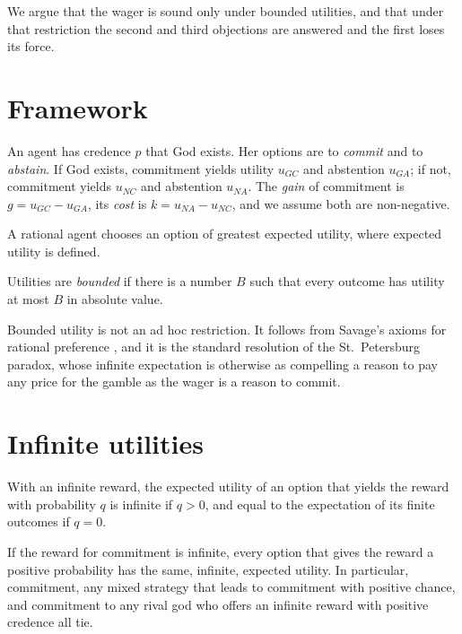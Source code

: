 \documentclass{situationist-preprint}
\begin{document}
We argue that the wager is sound only under bounded utilities, and that under that restriction the second and third objections are answered and the first loses its force.

\section{Framework}

\begin{definition}\label{d:wager}
An agent has credence $p$ that God exists. Her options are to \emph{commit} and to \emph{abstain}. If God exists, commitment yields utility $u_{GC}$ and abstention $u_{GA}$; if not, commitment yields $u_{NC}$ and abstention $u_{NA}$. The \emph{gain} of commitment is $g = u_{GC} - u_{GA}$, its \emph{cost} is $k = u_{NA} - u_{NC}$, and we assume both are non-negative.
\end{definition}

\begin{assumption}\label{a:eu}
A rational agent chooses an option of greatest expected utility, where expected utility is defined.
\end{assumption}

\begin{definition}\label{d:bounded}
Utilities are \emph{bounded} if there is a number $B$ such that every outcome has utility at most $B$ in absolute value.
\end{definition}

Bounded utility is not an ad hoc restriction. It follows from Savage's axioms for rational preference \citep{Savage1954}, and it is the standard resolution of the St.~Petersburg paradox, whose infinite expectation is otherwise as compelling a reason to pay any price for the gamble as the wager is a reason to commit.

\section{Infinite utilities}

\begin{definition}\label{d:xeu}
With an infinite reward, the expected utility of an option that yields the reward with probability $q$ is infinite if $q > 0$, and equal to the expectation of its finite outcomes if $q = 0$.
\end{definition}

\begin{proposition}\label{p:ties}
If the reward for commitment is infinite, every option that gives the reward a positive probability has the same, infinite, expected utility. In particular, commitment, any mixed strategy that leads to commitment with positive chance, and commitment to any rival god who offers an infinite reward with positive credence all tie.
\end{proposition}
\end{document}
